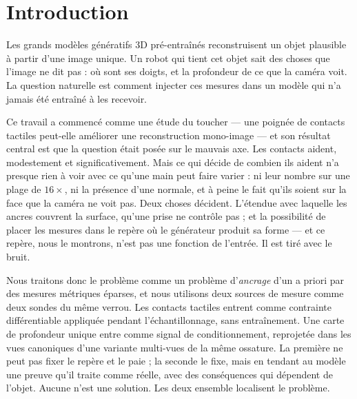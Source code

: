 \documentclass[conference]{IEEEtran}
\begin{document}
\section{Introduction}

Les grands modèles génératifs 3D pré-entraînés reconstruisent un objet plausible à
partir d'une image unique. Un robot qui tient cet objet sait des choses que l'image ne
dit pas : où sont ses doigts, et la profondeur de ce que la caméra voit. La question
naturelle est comment injecter ces mesures dans un modèle qui n'a jamais été entraîné
à les recevoir.

Ce travail a commencé comme une étude du toucher --- une poignée de contacts tactiles
peut-elle améliorer une reconstruction mono-image --- et son résultat central est que
la question était posée sur le mauvais axe. Les contacts aident, modestement et
significativement. Mais ce qui décide de combien ils aident n'a presque rien à voir
avec ce qu'une main peut faire varier : ni leur nombre sur une plage de $16\times$, ni
la présence d'une normale, et à peine le fait qu'ils soient sur la face que la caméra
ne voit pas. Deux choses décident. L'étendue avec laquelle les ancres couvrent la
surface, qu'une prise ne contrôle pas ; et la possibilité de placer les mesures dans le
repère où le générateur produit sa forme --- et ce repère, nous le montrons, n'est pas
une fonction de l'entrée. Il est tiré avec le bruit.

Nous traitons donc le problème comme un problème d'\emph{ancrage} d'un a priori par
des mesures métriques éparses, et nous utilisons deux sources de mesure comme deux
sondes du même verrou. Les contacts tactiles entrent comme contrainte différentiable
appliquée pendant l'échantillonnage, sans entraînement. Une carte de profondeur unique
entre comme signal de conditionnement, reprojetée dans les vues canoniques d'une
variante multi-vues de la même ossature. La première ne peut pas fixer le repère et le
paie ; la seconde le fixe, mais en tendant au modèle une preuve qu'il traite comme
réelle, avec des conséquences qui dépendent de l'objet. Aucune n'est une solution. Les
deux ensemble localisent le problème.
\end{document}

